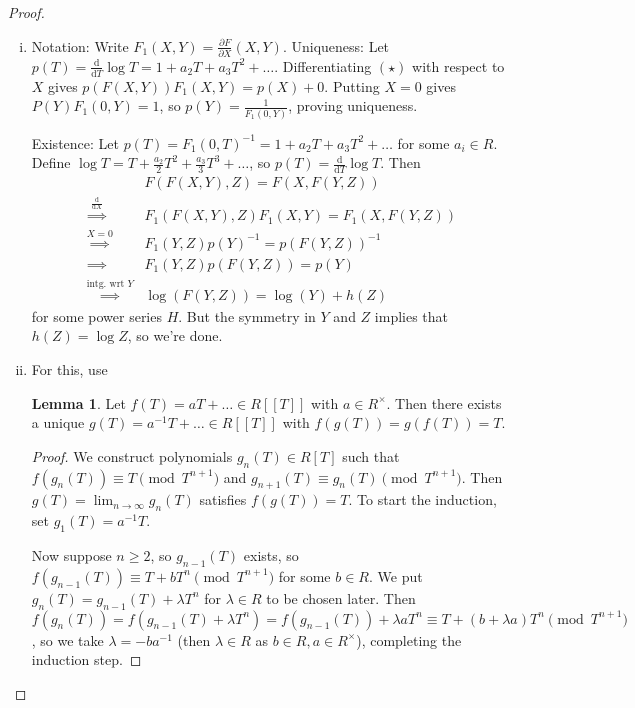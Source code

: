 \documentclass{article}
\theoremstyle{definition}
\newtheorem{lemma}[theorem]{Lemma}
\begin{document}
\begin{proof}
    \begin{enumerate}[(i)]
        \item Notation: Write $F_1(X,Y) = \frac{\partial F}{\partial X}(X,Y)$. Uniqueness: Let $p(T) = \frac{\mathrm{d}}{\mathrm{d}T}\log T = 1 + a_2 T + a_3 T^2 + \ldots$. Differentiating $(\star)$ with respect to $X$ gives $p(F(X,Y))F_1(X,Y) = p(X) + 0$. Putting $X=0$ gives $P(Y)F_1(0,Y)=1$, so $p(Y) = \frac{1}{F_1(0,Y)}$, proving uniqueness.
        \vspace{1mm}
         
        Existence: Let $p(T) = F_1(0,T)^{-1} = 1 + a_2T + a_3T^2 + \ldots$ for some $a_i \in R$. Define $\log T = T + \frac{a_2}{2}T^2 + \frac{a_3}{3}T^3 + \ldots$, so $p(T) = \frac{\mathrm{d}}{\mathrm{d}T}\log T$. Then 
        \begin{align*}
            &F(F(X,Y),Z) = F(X,F(Y,Z)) \\
            \stackrel{\frac{\mathrm{d}}{\mathrm{d}X}}{\implies}& F_1(F(X,Y),Z)F_1(X,Y) = F_1(X,F(Y,Z))\\
            \stackrel{X=0}{\implies}& F_1(Y,Z)p(Y)^{-1} = p(F(Y,Z))^{-1}\\
            \implies& F_1(Y,Z)p(F(Y,Z)) = p(Y) \\
            \stackrel{\text{intg. wrt }Y}{\implies}& \log(F(Y,Z)) = \log(Y) + h(Z) 
        \end{align*}
        for some power series $H$. But the symmetry in $Y$ and $Z$ implies that $h(Z)=\log Z$, so we're done.
        
        \item For this, use
        \begin{lemma}\label{lemma8.4}
            Let $f(T) = aT + \ldots \in R[[T]]$ with $a \in R^\times$. Then there exists a unique $g(T) = a^{-1}T + \ldots \in R[[T]]$ with $f(g(T))=g(f(T))=T$.
        \end{lemma}
        \begin{proof}
            We construct polynomials $g_{n}(T) \in R[T]$ such that $f(g_n(T)) \equiv T \pmod{T^{n+1}}$ and $g_{n+1}(T) \equiv g_n(T) \pmod{T^{n+1}}$. Then $g(T) = \lim_{n \to \infty}g_n(T)$ satisfies $f(g(T))=T$. To start the induction, set $g_1(T) = a^{-1}T$.
            \vspace{1mm}
             
            Now suppose $n\ge 2$, so $g_{n-1}(T)$ exists, so $f(g_{n-1}(T)) \equiv T + bT^n \pmod{T^{n+1}}$ for some $b \in R$. We put $g_n(T) = g_{n-1}(T) + \lambda T^n$ for $\lambda \in R$ to be chosen later. Then $f(g_n(T)) = f(g_{n-1}(T)+\lambda T^n) = f(g_{n-1}(T)) + \lambda a T^n \equiv T + (b+\lambda a)T^n\pmod{T^{n+1}}$, so we take $\lambda = -ba^{-1}$ (then $\lambda \in R$ as $b \in R, a \in R^\times$), completing the induction step.
            \vspace{1mm}
             

\end{proof}
\end{enumerate}
\end{proof}
\end{document}
